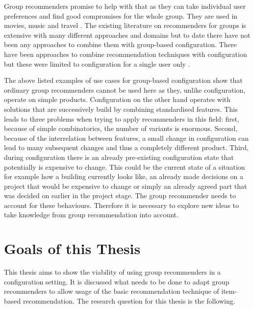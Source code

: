Group recommenders promise to help with that as they can take individual user preferences and find good compromises for the whole group. They are used in movies, music and travel \cite{garciaGroupRecommenderSystem2009, piliponyte2013sequential, peraGroupRecommenderMovies2013,felfernigGroupRecommenderApplications2018}. The existing literature on recommenders for groups is extensive with many different approaches and domains \cite{delicResearchMethodsGroup2016, chenInterfaceInteractionDesign2011, atasItemRecommendationUsing2017, jamesonRecommendationGroups2007, chenEmpatheticonsDesigningEmotion2014, liuCGSPAComprehensiveGroup2019} but to date there have not been any approaches to combine them with group-based configuration. There have been approaches to combine recommendation techniques with configuration but these were limited to configuration for a single user only \cite{pereiraFeatureBasedPersonalizedRecommender2016, scholzConfigurationbasedRecommenderSystem2017, scholzEffectsDecisionSpace2017}.


The above listed examples of use cases for group-based configuration show that ordinary group recommenders cannot be used here as they, unlike configuration, operate on simple products. Configuration on the other hand operates with solutions that are successively build by combining standardised features. This leads to three problems when trying to apply recommenders in this field: first, because of simple combinatorics, the number of variants is enormous. Second, because of the interrelation between features, a small change in configuration can lead to many subsequent changes and thus a completely different product. Third, during configuration there is an already pre-existing configuration state that potentially is expensive to change. This could be the current state of a situation for example how a building currently looks like, an already made decisions on a project that would be expensive to change or simply an already agreed part that was decided on earlier in the project stage. The group recommender needs to account for these behaviours. Therefore it is necessary to explore new ideas to take knowledge from group recommendation into account.

\section{Goals of this Thesis}
\label{sec:Introduction:Goals}

This thesis aims to show the viability of using group recommenders in a configuration setting. It is discussed what needs to be done to adapt group recommenders to allow usage of the basic recommendation technique of item-based recommendation. The research question for this thesis is the following.

